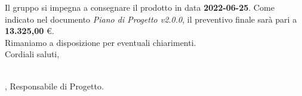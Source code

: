 \documentclass[a4paper]{scrlttr2}
\begin{document}
Il gruppo si impegna a consegnare il prodotto in data \textbf{2022-06-25}. Come indicato nel documento \textit{Piano di Progetto v2.0.0}, il preventivo finale sarà pari a \textbf{13.325,00} \euro{}. \\

Rimaniamo a disposizione per eventuali chiarimenti. \\

Cordiali saluti,

\begin{flushright}
\vspace*{30px}
\par\noindent\makebox[7.5cm]{\hrulefill} \\
\textit{\MG{}}, Responsabile di Progetto.
\end{flushright}
\end{document}

